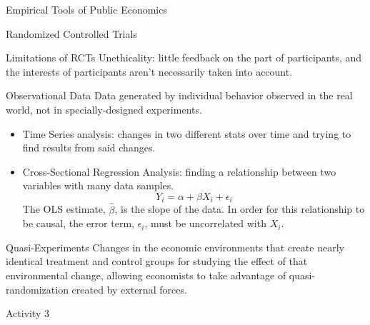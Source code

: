 \documentclass[10pt]{extarticle}
\begin{document}
\begin{problem}{Empirical Tools of Public Economics}
\begin{problem}{Randomized Controlled Trials}
\begin{problem}{Limitations of RCTs}
        Unethicality: little feedback on the part of participants, and the interests of participants aren't necessarily taken into account.
      \end{problem}
    \end{problem}
    \begin{problem}{Observational Data}
      Data generated by individual behavior observed in the real world, not in specially-designed experiments.
      \begin{itemize}
        \item Time Series analysis: changes in two different stats over time and trying to find results from said changes.
        \item Cross-Sectional Regression Analysis: finding a relationship between two variables with many data samples.
          \[
            Y_i = \alpha + \beta X_i + \epsilon_i
          \] 
          The OLS estimate, $\hat{\beta}$, is the slope of the data. In order for this relationship to be causal, the error term, $\epsilon_i$, must be uncorrelated with $X_i$.
      \end{itemize}
    \end{problem}
    \begin{problem}{Quasi-Experiments}
      Changes in the economic environments that create nearly identical treatment and control groups for studying the effect of that environmental change, allowing economists to take advantage of quasi-randomization created by external forces.
    \end{problem}
  \end{problem}
  \begin{problem}{Activity 3}
   \begin{tcbraster}[raster columns = 1,colframe = black!75!white,colback=white]
   \end{tcbraster}
  \end{problem}
\end{document}
